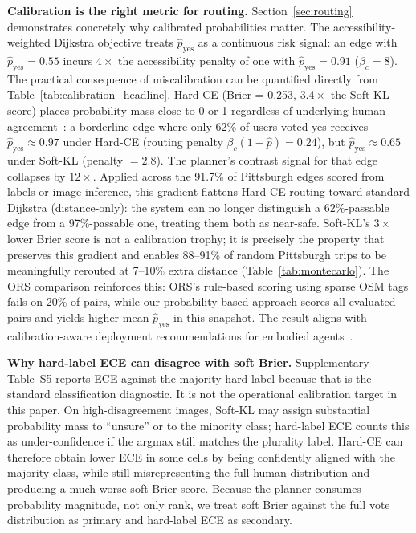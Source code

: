 \documentclass[conference]{IEEEtran}
\begin{document}
\textbf{Calibration is the right metric for routing.} Section~\ref{sec:routing} demonstrates concretely why calibrated probabilities matter. The accessibility-weighted Dijkstra objective treats $\hat{p}_\mathrm{yes}$ as a continuous risk signal: an edge with $\hat{p}_\mathrm{yes}=0.55$ incurs $4\times$ the accessibility penalty of one with $\hat{p}_\mathrm{yes}=0.91$ ($\beta_c=8$). The practical consequence of miscalibration can be quantified directly from Table~\ref{tab:calibration_headline}. Hard-CE (Brier = 0.253, $3.4\times$ the Soft-KL score) places probability mass close to 0 or 1 regardless of underlying human agreement~\cite{guo2017calibration,minderer2021revisiting}: a borderline edge where only 62\% of users voted yes receives $\hat{p}_\mathrm{yes}\approx 0.97$ under Hard-CE (routing penalty $\beta_c(1-\hat{p}) = 0.24$), but $\hat{p}_\mathrm{yes}\approx 0.65$ under Soft-KL (penalty $= 2.8$). The planner's contrast signal for that edge collapses by $12\times$. Applied across the 91.7\% of Pittsburgh edges scored from labels or image inference, this gradient flattens Hard-CE routing toward standard Dijkstra (distance-only): the system can no longer distinguish a 62\%-passable edge from a 97\%-passable one, treating them both as near-safe. Soft-KL's $3\times$ lower Brier score is not a calibration trophy; it is precisely the property that preserves this gradient and enables 88--91\% of random Pittsburgh trips to be meaningfully rerouted at 7--10\% extra distance (Table~\ref{tab:montecarlo}). The ORS comparison reinforces this: ORS's rule-based scoring using sparse OSM tags fails on 20\% of pairs, while our probability-based approach scores all evaluated pairs and yields higher mean $\hat{p}_\mathrm{yes}$ in this snapshot. The result aligns with calibration-aware deployment recommendations for embodied agents~\cite{zollo2025calibration}.

\textbf{Why hard-label ECE can disagree with soft Brier.} Supplementary Table~S5 reports ECE against the majority hard label because that is the standard classification diagnostic. It is not the operational calibration target in this paper. On high-disagreement images, Soft-KL may assign substantial probability mass to ``unsure'' or to the minority class; hard-label ECE counts this as under-confidence if the argmax still matches the plurality label. Hard-CE can therefore obtain lower ECE in some cells by being confidently aligned with the majority class, while still misrepresenting the full human distribution and producing a much worse soft Brier score. Because the planner consumes probability magnitude, not only rank, we treat soft Brier against the full vote distribution as primary and hard-label ECE as secondary.
\end{document}
